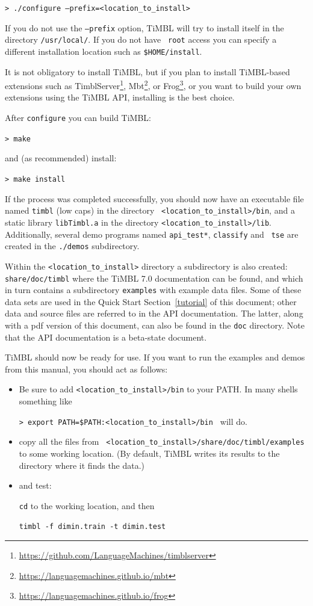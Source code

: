 \documentclass{book}
\begin{document}
{\tt > ./configure --prefix=<location\_to\_install>}

If you do not use the {\tt --prefix} option, TiMBL will try to install
itself in the directory {\tt /usr/local/}.  If you do not have {\tt
  root} access you can specify a different installation location such
as {\tt \$HOME/install}.

It is not obligatory to install TiMBL, but if you plan to install
TiMBL-based extensions such as
TimblServer\footnote{\url{https://github.com/LanguageMachines/timblserver}},
Mbt\footnote{\url{https://languagemachines.github.io/mbt}}, or
Frog\footnote{\url{https://languagemachines.github.io/frog}}, or you want to
build your own extensions using the TiMBL API, installing is the best
choice.

After {\tt configure} you can build TiMBL:

{\tt > make}

and (as recommended) install:

{\tt > make install }

If the process was completed successfully, you should now have an
executable file named {\tt timbl} (low caps) in the directory {\tt
  <location\_to\_install>/bin}, and a static library {\tt libTimbl.a}
in the directory {\tt <location\_to\_install>/lib}.  Additionally,
several demo programs named {\tt api\_test*}, {\tt classify} and {\tt
  tse} are created in the {\tt ./demos} subdirectory.

Within the {\tt <location\_to\_install>} directory a subdirectory is
also created: {\tt share/doc/timbl} where the TiMBL 7.0 documentation
can be found, and which in turn contains a subdirectory {\tt examples}
with example data files. Some of these data sets are used in the Quick
Start Section~\ref{tutorial} of this document; other data and source
files are referred to in the API documentation. The latter, along with
a pdf version of this document, can also be found in the {\tt doc}
directory. Note that the API documentation is a beta-state document.

TiMBL should now be ready for use. If you want to run the examples and
demos from this manual, you should act as follows:

\begin{itemize}
\item Be sure to add {\tt <location\_to\_install>/bin} to your PATH.
In many shells something like

 {\tt > export PATH=\$PATH:<location\_to\_install>/bin }
will do.
\item copy all the files from {\tt
  <location\_to\_install>/share/doc/timbl/examples} to some working
location. (By default, TiMBL writes its results to the directory where
it finds the data.)
\item and test:

{\tt cd} to the working location, and then

{\tt timbl -f dimin.train -t dimin.test}
\end{itemize}
\end{document}
